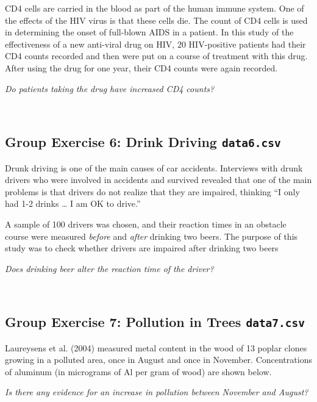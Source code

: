 \documentclass[]{article}
\begin{document}
CD4 cells are carried in the blood as part of the human immune system.
One of the effects of the HIV virus is that these cells die. The count
of CD4 cells is used in determining the onset of full-blown AIDS in a
patient. In this study of the effectiveness of a new anti-viral drug on
HIV, 20 HIV-positive patients had their CD4 counts recorded and then
were put on a course of treatment with this drug. After using the drug
for one year, their CD4 counts were again recorded.

{\emph{Do patients taking the drug have increased CD4 counts?}}

~

\hypertarget{group-exercise-6-drink-driving-data6.csv}{%
\subsection{\texorpdfstring{Group Exercise 6: Drink Driving
\texttt{data6.csv}}{Group Exercise 6: Drink Driving data6.csv}}\label{group-exercise-6-drink-driving-data6.csv}}

Drunk driving is one of the main causes of car accidents. Interviews
with drunk drivers who were involved in accidents and survived revealed
that one of the main problems is that drivers do not realize that they
are impaired, thinking ``I only had 1-2 drinks \ldots{} I am OK to
drive.''

A sample of 100 drivers was chosen, and their reaction times in an
obstacle course were measured \emph{before} and \emph{after} drinking
two beers. The purpose of this study was to check whether drivers are
impaired after drinking two beers

{\emph{Does drinking beer alter the reaction time of the driver?}}

~

\hypertarget{group-exercise-7-pollution-in-trees-data7.csv}{%
\subsection{\texorpdfstring{Group Exercise 7: Pollution in Trees
\texttt{data7.csv}}{Group Exercise 7: Pollution in Trees data7.csv}}\label{group-exercise-7-pollution-in-trees-data7.csv}}

Laureysens et al. (2004) measured metal content in the wood of 13 poplar
clones growing in a polluted area, once in August and once in November.
Concentrations of aluminum (in micrograms of Al per gram of wood) are
shown below.

{\emph{Is there any evidence for an increase in pollution between
November and August?}}
\end{document}
